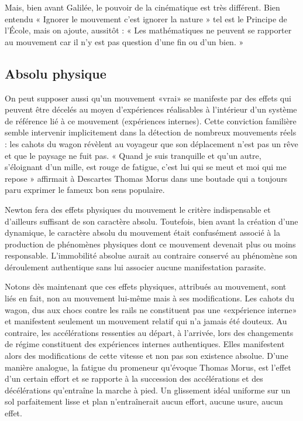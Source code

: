 Mais, bien avant Galilée, le pouvoir de la cinématique est très différent.
Bien entendu « Ignorer le mouvement c’est ignorer la nature » tel est
le Principe de l’École, mais on ajoute, aussitôt : « Les mathématiques ne
peuvent se rapporter au mouvement car il n’y est pas question d’une
fin ou d’un bien. »

\subsection{Absolu physique}

On peut supposer aussi qu’un mouvement «vrai» se manifeste par
des effets qui peuvent être décelés au moyen d’expériences réalisables à
l’intérieur d’un système de référence lié à ce mouvement (expériences
internes). Cette conviction familière semble intervenir implicitement dans
la détection de nombreux mouvements réels : les cahots du wagon
révèlent au voyageur que son déplacement n’est pas un rêve et que le
paysage ne fuit pas. « Quand je suis tranquille et qu’un autre, s’éloignant
d’un mille, est rouge de fatigue, c’est lui qui se meut et moi qui me repose »
affirmait à Descartes Thomas Morus dans une boutade qui a toujours
paru exprimer le fameux bon sens populaire.

Newton fera des effets physiques du mouvement le critère indispensable
et d’ailleurs suffisant de son caractère absolu. Toutefois, bien avant
la création d’une dynamique, le caractère absolu du mouvement était
confusément associé à la production de phénomènes physiques dont ce
mouvement devenait plus ou moins responsable. L’immobilité absolue
aurait au contraire conservé au phénomène son déroulement authentique
sans lui associer aucune manifestation parasite.

Notons dès maintenant que ces effets physiques, attribués au mouvement,
sont liés en fait, non au mouvement lui-même mais à ses modifications.
Les cahots du wagon, dus aux chocs contre les rails ne constituent
pas une «expérience interne» et manifestent seulement un
mouvement relatif qui n’a jamais été douteux. Au contraire, les accélérations
ressenties au départ, à l’arrivée, lors des changements de régime
constituent des expériences internes authentiques. Elles manifestent
alors des modifications de cette vitesse et non pas son existence absolue.
D'une manière analogue, la fatigue du promeneur qu’évoque Thomas
Morus, est l’effet d’un certain effort et se rapporte à la succession des
accélérations et des décélérations qu’entraîne la marche à pied. Un
glissement idéal uniforme sur un sol parfaitement lisse et plan n’entraînerait
aucun effort, aucune usure, aucun effet.

